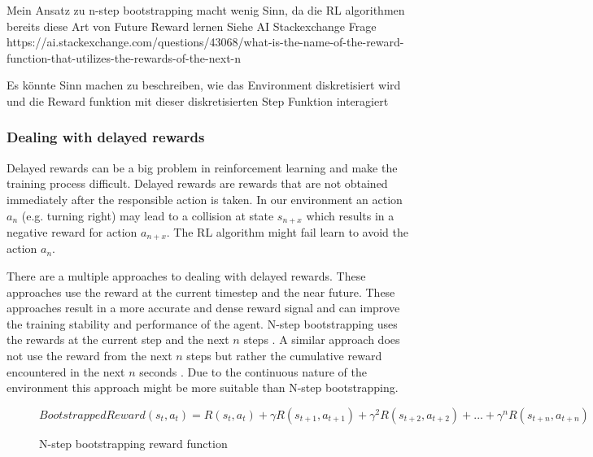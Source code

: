 

Mein Ansatz zu n-step bootstrapping macht wenig Sinn, da die RL algorithmen bereits diese Art von Future Reward lernen
Siehe AI Stackexchange Frage https://ai.stackexchange.com/questions/43068/what-is-the-name-of-the-reward-function-that-utilizes-the-rewards-of-the-next-n

Es könnte Sinn machen zu beschreiben, wie das Environment diskretisiert wird und die Reward funktion mit dieser diskretisierten Step Funktion interagiert

\subsubsection{Dealing with delayed rewards}
Delayed rewards can be a big problem in reinforcement learning and make the training process difficult. Delayed rewards are rewards that are not obtained immediately after the responsible action is taken. In our environment an action \(a_n\) (e.g. turning right) may lead to a collision at state \(s_{n+x}\) which results in a negative reward for action \(a_{n+x}\). The RL algorithm might fail learn to avoid the action \(a_n\).

There are a multiple approaches to dealing with delayed rewards. These approaches use the reward at the current timestep and the near future. These approaches result in a more accurate and dense reward signal and can improve the training stability and performance of the agent.
N-step bootstrapping uses the rewards at the current step and the next \(n\) steps \autocite{nstepbootstrapping}.
A similar approach does not use the reward from the next \(n\) steps but rather the cumulative reward encountered in the next \(n\) seconds \autocite{trackmania}. Due to the continuous nature of the environment this approach might be more suitable than N-step bootstrapping.

\begin{figure}
     \[BootstrappedReward(s_t,a_t) = R(s_t,a_t) + \gamma R(s_{t+1},a_{t+1}) + \gamma^2 R(s_{t+2},a_{t+2}) + ... + \gamma^n R(s_{t+n},a_{t+n})\]
     \caption{N-step bootstrapping reward function \autocite{nstepbootstrapping}}
\end{figure}
\fi


